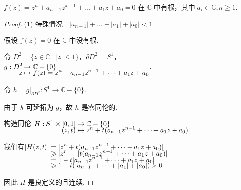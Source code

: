 \begin{theorem}[代数学基本定理][thm:11.1]
    $f(z) = z^n + a_{n-1}z^{n-1} + \dots + a_1 z + a_0 = 0$ 在 $\mathbb{C}$ 中有根，其中 $a_i \in \mathbb{C}, n \geq 1$.
\end{theorem}

\begin{proof}
    (1) 特殊情况：$|a_{n-1}| + \dots + |a_1| + |a_0| < 1$.\par
    假设 $f(z)=0$ 在 $\mathbb{C}$ 中没有根.\par
    令 $D^2 = \{z \in \mathbb{C} \mid |z| \leq 1\}$，$\partial D^2 = S^1$，
    $\setjot[-4]\begin{aligned}[t]
        g: D^2 &\to \mathbb{C}-\{0\} \\
        z &\mapsto f(z) = z^n + a_{n-1}z^{n-1} + \dots + a_1 z + a_0
    \end{aligned}$.\par
    令 $h = g|_{\partial D^2}: S^1 \longrightarrow \mathbb{C}-\{0\}$.

    由于 $h$ 可延拓为 $g$，故 $h$ 是零同伦的.\par
    构造同伦 $\setjot[-4]\begin{aligned}[t]
        H: S^1 \times [0, 1] &\to \mathbb{C}-\{0\} \\
        (z, t) &\mapsto z^n + t(a_{n-1}z^{n-1} + \dots + a_1 z + a_0)
    \end{aligned}$\par
    我们有$\setjot[-4]\begin{aligned}[t]
        |H(z, t)| &= |z^n + t(a_{n-1}z^{n-1} + \dots + a_1 z + a_0)| \\
    &\geq |z^n| - |t(a_{n-1}z^{n-1} + \dots + a_1 z + a_0)| \\
    &= 1 - t|a_{n-1}z^{n-1} + \dots + a_1 z + a_0| \\
    &\geq 1 - t(|a_{n-1}| + \dots + |a_1| + |a_0|) > 0
    \end{aligned}$

    因此 $H$ 是良定义的且连续.


\end{proof}
